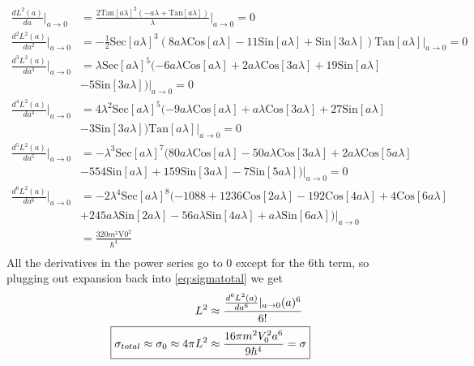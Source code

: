 \documentclass{jhwhw}
\begin{document}
\begin{align}
    \frac{d L^2(a)}{da}|_{a \to 0} &= \frac{2 \text{Tan}[a \lambda ]^2 (-a \lambda +\text{Tan}[a \lambda ])}{\lambda }|_{a \to 0} = 0 \\
    \frac{d^2 L^2(a)}{da^2}|_{a \to 0} &= -\frac{1}{2} \text{Sec}[a \lambda ]^3 (8 a \lambda  \text{Cos}[a \lambda ]-11 \text{Sin}[a \lambda ]+\text{Sin}[3 a \lambda ]) \text{Tan}[a \lambda ]|_{a \to 0} = 0 \\
    \frac{d^3 L^2(a)}{da^3}|_{a \to 0} &= \lambda  \text{Sec}[a \lambda ]^5 (-6 a \lambda  \text{Cos}[a \lambda ]+2 a \lambda  \text{Cos}[3 a \lambda ]+19 \text{Sin}[a \lambda ]
    \\& -5 \text{Sin}[3 a \lambda ]) |_{a \to 0}= 0 \\
    \frac{d^4 L^2(a)}{da^4}|_{a \to 0} &= 4 \lambda ^2 \text{Sec}[a \lambda ]^5 (-9 a \lambda  \text{Cos}[a \lambda ]+a \lambda  \text{Cos}[3 a \lambda ]+27 \text{Sin}[a \lambda ]
    \\ &-3 \text{Sin}[3 a \lambda ]) \text{Tan}[a \lambda ] |_{a \to 0}= 0 \\
    \frac{d^5 L^2(a)}{da^5}|_{a \to 0} &= -\lambda ^3 \text{Sec}[a \lambda ]^7 (80 a \lambda  \text{Cos}[a \lambda ]-50 a \lambda  \text{Cos}[3 a \lambda ]+2 a \lambda  \text{Cos}[5 a \lambda ] 
    \\ & -554 \text{Sin}[a \lambda ]+159 \text{Sin}[3 a \lambda ]-7 \text{Sin}[5 a \lambda ]) |_{a \to 0}= 0 \\
    \frac{d^6 L^2(a)}{da^6}|_{a \to 0} &= -2 \lambda ^4 \text{Sec}[a \lambda ]^8 (-1088+1236 \text{Cos}[2 a \lambda ]-192 \text{Cos}[4 a \lambda ]+4 \text{Cos}[6 a \lambda ]
    \\ & +245 a \lambda  \text{Sin}[2 a \lambda ]-56 a \lambda  \text{Sin}[4 a \lambda ]+a \lambda  \text{Sin}[6 a \lambda ]) |_{a \to 0}\\
    &=\frac{320 m^2 \text{V0}^2}{\hbar ^4} \\
\end{align}
All the derivatives in the power series go to 0 except for the 6th term, so plugging out expansion back into
\eqref{eq:sigmatotal} we get
\begin{align}
    L^2 &\approx \frac {\frac{d^6 L^2(a)}{da^6}|_{a \to 0} (a)^6}{6!} \\
    \Aboxed{\sigma_{total} \approx \sigma_0 \approx 4\pi L^2 &\approx \frac{16 \pi m^2 V_0^2 a^6}{9 \hbar^4} = \sigma}
\end{align}
\pagebreak[4]
\end{document}
